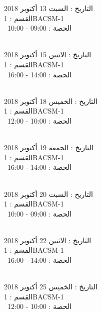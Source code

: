 \documentclass[14pt a4paper twocolumn]{book}
\begin{document}
التاريخ : السبت 13 أكتوبر 2018 \\
القسم : 1BACSM-1 \\
 \  
الحصة : 09:00 - 10:00 \\
\par
\noindent\makebox[\linewidth]{\rule{\paperwidth}{0.4pt}}
 \\
التاريخ : الاثنين 15 أكتوبر 2018 \\
القسم : 1BACSM-1 \\
 \  
الحصة : 14:00 - 16:00 \\
\par
\noindent\makebox[\linewidth]{\rule{\paperwidth}{0.4pt}}
 \\
التاريخ : الخميس 18 أكتوبر 2018 \\
القسم : 1BACSM-1 \\
 \  
الحصة : 10:00 - 12:00 \\
\par
\noindent\makebox[\linewidth]{\rule{\paperwidth}{0.4pt}}
 \\
التاريخ : الجمعة 19 أكتوبر 2018 \\
القسم : 1BACSM-1 \\
 \  
الحصة : 14:00 - 16:00 \\
\par
\noindent\makebox[\linewidth]{\rule{\paperwidth}{0.4pt}}
 \\
التاريخ : السبت 20 أكتوبر 2018 \\
القسم : 1BACSM-1 \\
 \  
الحصة : 09:00 - 10:00 \\
\par
\noindent\makebox[\linewidth]{\rule{\paperwidth}{0.4pt}}
 \\
التاريخ : الاثنين 22 أكتوبر 2018 \\
القسم : 1BACSM-1 \\
 \  
الحصة : 14:00 - 16:00 \\
\par
\noindent\makebox[\linewidth]{\rule{\paperwidth}{0.4pt}}
 \\
التاريخ : الخميس 25 أكتوبر 2018 \\
القسم : 1BACSM-1 \\
 \  
الحصة : 10:00 - 12:00 \\
\par
\end{document}
